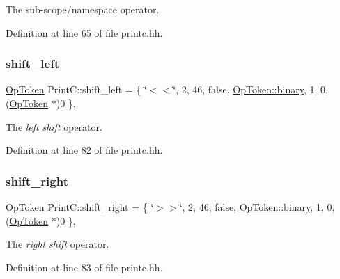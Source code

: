 The sub-\/scope/namespace operator. 



Definition at line 65 of file printc.\+hh.

\mbox{\label{class_print_c_a49158efdd9a95cc787de8e7fb499b621}} 
\subsubsection{\texorpdfstring{shift\_left}{shift\_left}}
{\footnotesize\ttfamily \mbox{\hyperlink{class_op_token}{Op\+Token}} Print\+C\+::shift\+\_\+left = \{ \char`\"{}$<$$<$\char`\"{}, 2, 46, false, \mbox{\hyperlink{class_op_token_af41c7f108d5662ede7765c5a6c44eaffa3a2ec63522a9329a71ddbe8adc3e752d}{Op\+Token\+::binary}}, 1, 0, (\mbox{\hyperlink{class_op_token}{Op\+Token}} $\ast$)0 \}\hspace{0.3cm}{\ttfamily [static]}, {\ttfamily [protected]}}



The {\itshape left} {\itshape shift} operator. 



Definition at line 82 of file printc.\+hh.

\mbox{\label{class_print_c_ac6a0bf963ec7eeb61a71e5e74f2ec803}} 
\subsubsection{\texorpdfstring{shift\_right}{shift\_right}}
{\footnotesize\ttfamily \mbox{\hyperlink{class_op_token}{Op\+Token}} Print\+C\+::shift\+\_\+right = \{ \char`\"{}$>$$>$\char`\"{}, 2, 46, false, \mbox{\hyperlink{class_op_token_af41c7f108d5662ede7765c5a6c44eaffa3a2ec63522a9329a71ddbe8adc3e752d}{Op\+Token\+::binary}}, 1, 0, (\mbox{\hyperlink{class_op_token}{Op\+Token}} $\ast$)0 \}\hspace{0.3cm}{\ttfamily [static]}, {\ttfamily [protected]}}



The {\itshape right} {\itshape shift} operator. 



Definition at line 83 of file printc.\+hh.

\mbox{\label{class_print_c_aff37c9f618ad0e52ae8e117fa950563e}} 
